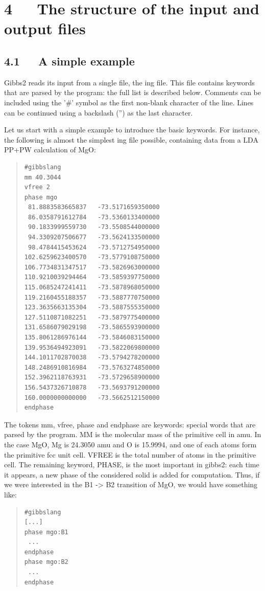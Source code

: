 \documentclass[a4paper]{article}
\begin{document}
\section{4~~~The structure of the input and output files%
  \label{the-structure-of-the-input-and-output-files}%
}


\subsection{4.1~~~A simple example%
  \label{a-simple-example}%
}

Gibbs2 reads its input from a single file, the ing file. This file
contains keywords that are parsed by the program: the full list is
described below. Comments can be included using the '\#' symbol as the
first non-blank character of the line. Lines can be continued using a
backslash ('') as the last character.

Let us start with a simple example to introduce the
basic keywords. For instance, the following is almost the simplest ing
file possible, containing data from a LDA PP+PW calculation of MgO:
%
\begin{quote}
\begin{verbatim}
#gibbslang
mm 40.3044
vfree 2
phase mgo
 81.8883583665837   -73.5171659350000
 86.0358791612784   -73.5360133400000
 90.1833999559730   -73.5508544000000
 94.3309207506677   -73.5624133500000
 98.4784415453624   -73.5712754950000
102.6259623400570   -73.5779108750000
106.7734831347517   -73.5826963000000
110.9210039294464   -73.5859397750000
115.0685247241411   -73.5878968050000
119.2160455188357   -73.5887770750000
123.3635663135304   -73.5887555350000
127.5110871082251   -73.5879775400000
131.6586079029198   -73.5865593900000
135.8061286976144   -73.5846083150000
139.9536494923091   -73.5822069800000
144.1011702870038   -73.5794278200000
148.2486910816984   -73.5763274850000
152.3962118763931   -73.5729658900000
156.5437326710878   -73.5693791200000
160.0000000000000   -73.5662512150000
endphase
\end{verbatim}
\end{quote}

The tokens mm, vfree, phase and endphase are keywords: special words
that are parsed by the program. MM is the molecular mass of the
primitive cell in amu. In the case MgO, Mg is 24.3050 amu and O is
15.9994, and one of each atoms form the primitive fcc unit cell. VFREE
is the total number of atoms in the primitive cell. The remaining
keyword, PHASE, is the most important in gibbs2: each time it appears,
a new phase of the considered solid is added for computation. Thus, if
we were interested in the B1 -> B2 transition of MgO, we would have
something like:
%
\begin{quote}
\begin{verbatim}
#gibbslang
[...]
phase mgo:B1
 ...
endphase
phase mgo:B2
 ...
endphase
\end{verbatim}
\end{quote}
\end{document}
